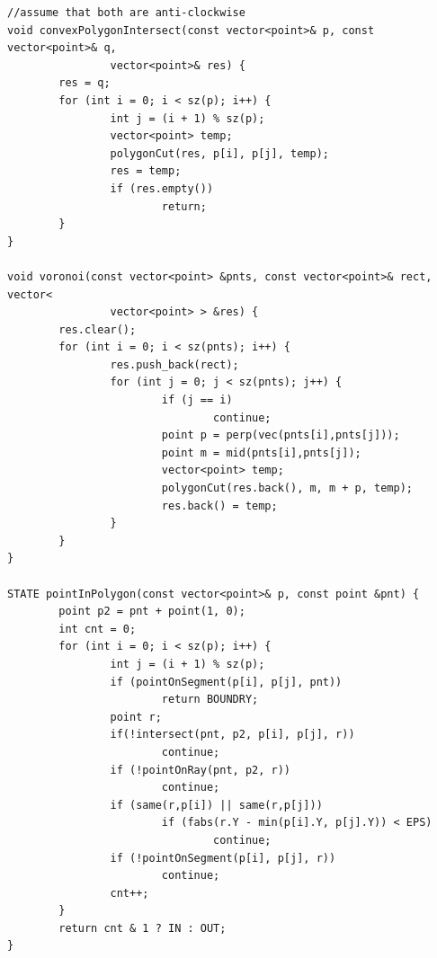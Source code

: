 \documentclass[12pt]{book}
\begin{document}
\begin{verbatim}
//assume that both are anti-clockwise
void convexPolygonIntersect(const vector<point>& p, const vector<point>& q,
                vector<point>& res) {
        res = q;
        for (int i = 0; i < sz(p); i++) {
                int j = (i + 1) % sz(p);
                vector<point> temp;
                polygonCut(res, p[i], p[j], temp);
                res = temp;
                if (res.empty())
                        return;
        }
}

void voronoi(const vector<point> &pnts, const vector<point>& rect, vector<
                vector<point> > &res) {
        res.clear();
        for (int i = 0; i < sz(pnts); i++) {
                res.push_back(rect);
                for (int j = 0; j < sz(pnts); j++) {
                        if (j == i)
                                continue;
                        point p = perp(vec(pnts[i],pnts[j]));
                        point m = mid(pnts[i],pnts[j]);
                        vector<point> temp;
                        polygonCut(res.back(), m, m + p, temp);
                        res.back() = temp;
                }
        }
}

STATE pointInPolygon(const vector<point>& p, const point &pnt) {
        point p2 = pnt + point(1, 0);
        int cnt = 0;
        for (int i = 0; i < sz(p); i++) {
                int j = (i + 1) % sz(p);
                if (pointOnSegment(p[i], p[j], pnt))
                        return BOUNDRY;
                point r;
                if(!intersect(pnt, p2, p[i], p[j], r))
                        continue;
                if (!pointOnRay(pnt, p2, r))
                        continue;
                if (same(r,p[i]) || same(r,p[j]))
                        if (fabs(r.Y - min(p[i].Y, p[j].Y)) < EPS)
                                continue;
                if (!pointOnSegment(p[i], p[j], r))
                        continue;
                cnt++;
        }
        return cnt & 1 ? IN : OUT;
}
\end{verbatim}
\end{document}
